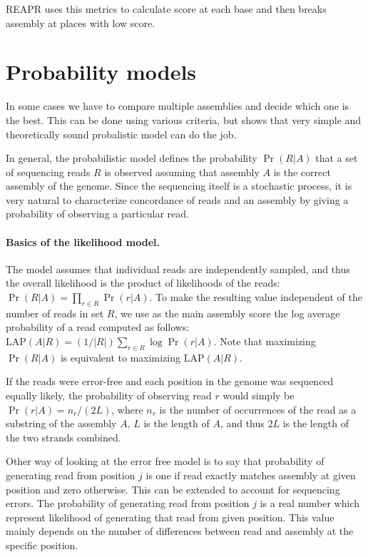 REAPR uses this metrics to calculate score at each base and then breaks assembly at places with low score.

\section{Probability models}
\label{sec:prob}
In some cases we have to compare multiple assemblies and decide which one is
the best. This can be done using various criteria, but \cite{Ghodsi2013} shows
that very simple and theoretically sound probalistic model can do the job.

In general, the probabilistic model defines the probability $\Pr(R|A)$ that a set of
sequencing reads $R$ is observed assuming that assembly $A$ is the
correct assembly of the genome. Since the sequencing itself is a
stochastic process, it is very natural to characterize concordance of
reads and an assembly by giving a probability of observing a particular
read.

\def\LAP{\mathrm{LAP}}

\paragraph{Basics of the likelihood model.}
The model assumes
that individual reads are independently sampled, and thus the overall
likelihood is the product of likelihoods of the reads:
$\Pr(R|A) = \prod_{r\in R} \Pr(r|A).$
To make
the resulting value independent of the number of reads in set 
$R$, we use as the main
assembly score the log average probability of a read computed as
follows: $\LAP(A|R) = (1/|R|)\sum_{r\in R} \log \Pr(r|A).$ Note that
maximizing $\Pr(R|A)$ is equivalent to maximizing $\LAP(A|R)$.

If the reads were error-free and each position in the genome was
sequenced equally likely, the probability of observing read $r$
would simply be $\Pr(r|A)=n_r/(2L)$, where $n_r$ is the number of 
occurrences of the read as a substring of the assembly $A$,
$L$ is the length of $A$, and thus $2L$ is the length of the two
strands combined.

Other way of looking at the error free model is to say that probability
of generating read from position $j$ is one if read exactly matches 
assembly at given position and zero otherwise. This can be extended
to account for sequencing errors. The probability of generating read
from position $j$ is a real number which represent likelihood of generating
that read from given position. This value mainly depends on the number
of differences between read and assembly at the specific position.

